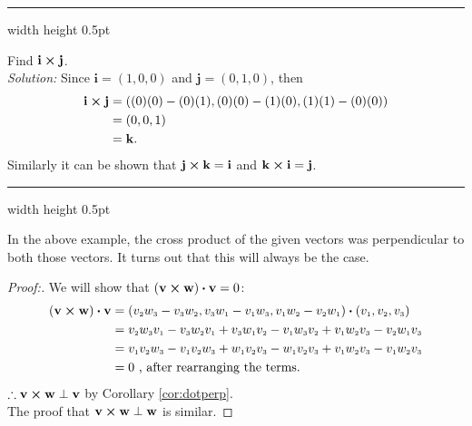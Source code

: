 \hrule width \textwidth height 0.5pt
\piccaption[]{}
\begin{exmp}\label{exmp:crossijk}
 Find $\mathbf{i} \bm{\times} \mathbf{j}$.\smallskip\\\emph{Solution:}
 Since $\mathbf{i} = (1,0,0)$ and $\mathbf{j} = (0,1,0)$, then
 \begin{align*}
  \mathbf{i} \bm{\times} \mathbf{j} &= ((0)(0) - (0)(1),(0)(0) - (1)(0),(1)(1) - (0)(0))\\
  &= (0,0,1)\\
  &= \mathbf{k}.
 \end{align*}
Similarly it can be shown that $\mathbf{j} \bm{\times} \mathbf{k} = \mathbf{i}$ and
$\mathbf{k} \bm{\times} \mathbf{i} = \mathbf{j}$.
\end{exmp}
\hrule width \textwidth height 0.5pt
\medskip

In the above example, the cross product of the given vectors was perpendicular to both those vectors. It
turns out that this will always be the case.

\begin{proofbar}\begin{proof}[Proof:]
 We will show that $(\mathbf{v} \bm{\times} \mathbf{w}) \bm{\cdot} \mathbf{v} = 0$:
 \begin{align*}
  (\mathbf{v} \bm{\times} \mathbf{w}) \bm{\cdot} \mathbf{v} &= (v_{\scriptscriptstyle 2}w_{\scriptscriptstyle 3} -
  v_{\scriptscriptstyle 3}w_{\scriptscriptstyle 2}, v_{\scriptscriptstyle 3}w_{\scriptscriptstyle 1} - v_{\scriptscriptstyle 1}w_{\scriptscriptstyle 3}, v_{\scriptscriptstyle 1}w_{\scriptscriptstyle 2} -
  v_{\scriptscriptstyle 2}w_{\scriptscriptstyle 1}) \bm{\cdot} (v_{\scriptscriptstyle 1},v_{\scriptscriptstyle 2},v_{\scriptscriptstyle 3})\\
  &= v_{\scriptscriptstyle 2}w_{\scriptscriptstyle 3}v_{\scriptscriptstyle 1} - v_{\scriptscriptstyle 3}w_{\scriptscriptstyle 2}v_{\scriptscriptstyle 1} +
  v_{\scriptscriptstyle 3}w_{\scriptscriptstyle 1}v_{\scriptscriptstyle 2} - v_{\scriptscriptstyle 1}w_{\scriptscriptstyle 3}v_{\scriptscriptstyle 2} + v_{\scriptscriptstyle 1}w_{\scriptscriptstyle 2}v_{\scriptscriptstyle 3} -
  v_{\scriptscriptstyle 2}w_{\scriptscriptstyle 1}v_{\scriptscriptstyle 3}\\
  &= v_{\scriptscriptstyle 1}v_{\scriptscriptstyle 2}w_{\scriptscriptstyle 3} - v_{\scriptscriptstyle 1}v_{\scriptscriptstyle 2}w_{\scriptscriptstyle 3} + w_{\scriptscriptstyle 1}v_{\scriptscriptstyle 2}v_{\scriptscriptstyle 3} -
  w_{\scriptscriptstyle 1}v_{\scriptscriptstyle 2}v_{\scriptscriptstyle 3} + v_{\scriptscriptstyle 1}w_{\scriptscriptstyle 2}v_{\scriptscriptstyle 3} - v_{\scriptscriptstyle 1}w_{\scriptscriptstyle 2}v_{\scriptscriptstyle 3}\\
  &= 0 \text{~, after rearranging the terms.}
 \end{align*}
 $\therefore \mathbf{v} \bm{\times} \mathbf{w} \perp \mathbf{v}$ by Corollary \ref{cor:dotperp}.\\
 The proof that $\mathbf{v} \bm{\times} \mathbf{w} \perp \mathbf{w}$ is similar.
\end{proof}\end{proofbar}

